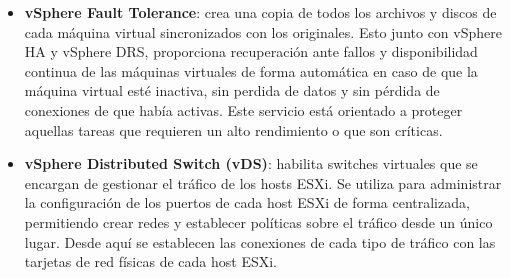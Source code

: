 \begin{itemize}
    \item \textbf{vSphere Fault Tolerance}: crea una copia de todos los archivos y discos de cada máquina virtual sincronizados con los originales. Esto junto con vSphere HA y vSphere DRS, proporciona recuperación ante fallos y  disponibilidad continua de las máquinas virtuales de forma automática en caso de que la máquina virtual esté inactiva, sin perdida de datos y sin pérdida de conexiones de que había activas. Este servicio está orientado a proteger aquellas tareas que requieren un alto rendimiento o que son críticas.

    \item \textbf{vSphere Distributed Switch (vDS)}: habilita switches virtuales que se encargan de gestionar el tráfico de los hosts ESXi. Se utiliza para administrar la configuración de los puertos de cada host ESXi de forma centralizada, permitiendo crear redes y establecer políticas sobre el tráfico desde un único lugar. Desde aquí se establecen las conexiones de cada tipo de tráfico con las tarjetas de red físicas de cada host ESXi.
    
    
\end{itemize}

